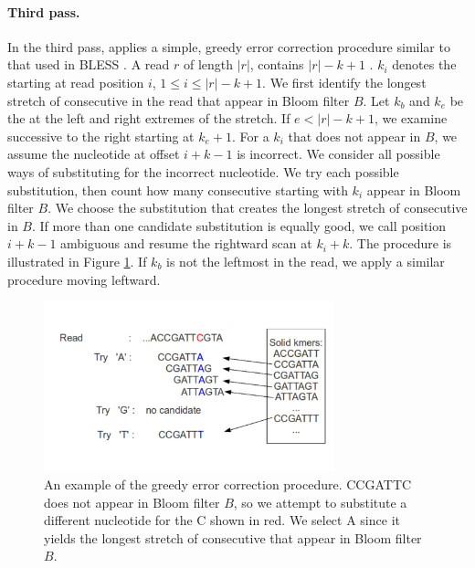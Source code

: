 \documentclass[10pt]{article}
\begin{document}

\paragraph{Third pass.} 
In the third pass, \tool applies a simple, greedy error correction procedure similar to that used in BLESS \cite{heo2014bless}.
A read $r$ of length $|r|$, contains $|r|-k+1$ \kmers.
$k_i$ denotes the \kmer starting at read position $i$, $1\le i\le|r|-k+1$.
We first identify the longest stretch of consecutive \kmers in the read that appear in Bloom filter $B$.
Let $k_b$ and $k_e$ be the \kmers at the left and right extremes of the stretch.
If $e < |r|-k+1$, we examine successive \kmers to the right starting at $k_e+1$.
For a \kmer $k_i$ that does not appear in $B$, we assume the nucleotide at offset $i+k-1$ is incorrect.
We consider all possible ways of substituting for the incorrect nucleotide.
We try each possible substitution, then count how many consecutive \kmers starting with $k_i$ appear in Bloom filter $B$.
We choose the substitution that creates the longest stretch of consecutive \kmers in $B$.
If more than one candidate substitution is equally good, we call position $i+k-1$ ambiguous and resume the rightward scan at \kmer $k_i+k$.
The procedure is illustrated in Figure \ref{fig:error_correction}.  If $k_b$ is not the leftmost \kmer in the read, we apply a similar procedure moving leftward.

\begin{figure}[h!]
\begin{center}
\includegraphics[width=0.75\textwidth]{ErrorCorrection.jpg}
\caption{An example of the greedy error correction procedure.  \kmer CCGATTC does not appear in Bloom filter $B$, so we attempt to substitute a different nucleotide for the C shown in red.  We select A since it yields the longest stretch of consecutive \kmers that appear in Bloom filter $B$.  \label{fig:error_correction}}
\end{center}
\end{figure}
\end{document}
